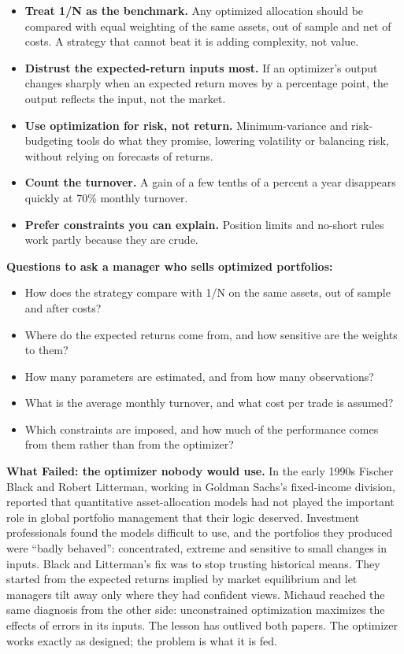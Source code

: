 \begin{itemize}
  \item \textbf{Treat 1/N as the benchmark.} Any optimized allocation should be compared with equal weighting of the same assets, out of sample and net of costs. A strategy that cannot beat it is adding complexity, not value.
  \item \textbf{Distrust the expected-return inputs most.} If an optimizer's output changes sharply when an expected return moves by a percentage point, the output reflects the input, not the market.
  \item \textbf{Use optimization for risk, not return.} Minimum-variance and risk-budgeting tools do what they promise, lowering volatility or balancing risk, without relying on forecasts of returns.
  \item \textbf{Count the turnover.} A gain of a few tenths of a percent a year disappears quickly at 70\% monthly turnover.
  \item \textbf{Prefer constraints you can explain.} Position limits and no-short rules work partly because they are crude.
\end{itemize}

\textbf{Questions to ask a manager who sells optimized portfolios:}

\begin{itemize}
  \item How does the strategy compare with 1/N on the same assets, out of sample and after costs?
  \item Where do the expected returns come from, and how sensitive are the weights to them?
  \item How many parameters are estimated, and from how many observations?
  \item What is the average monthly turnover, and what cost per trade is assumed?
  \item Which constraints are imposed, and how much of the performance comes from them rather than from the optimizer?
\end{itemize}

\begin{callout}
\textbf{What Failed: the optimizer nobody would use.} In the early 1990s Fischer Black and Robert Litterman, working in Goldman Sachs's fixed-income division, reported that quantitative asset-allocation models had not played the important role in global portfolio management that their logic deserved. Investment professionals found the models difficult to use, and the portfolios they produced were ``badly behaved'': concentrated, extreme and sensitive to small changes in inputs. Black and Litterman's fix was to stop trusting historical means. They started from the expected returns implied by market equilibrium and let managers tilt away only where they had confident views. Michaud reached the same diagnosis from the other side: unconstrained optimization maximizes the effects of errors in its inputs. The lesson has outlived both papers. The optimizer works exactly as designed; the problem is what it is fed.
\end{callout}

